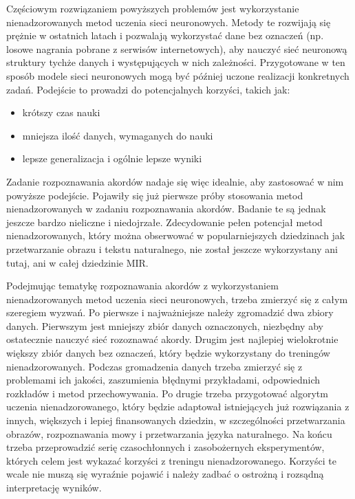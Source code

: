 Częściowym rozwiązaniem powyższych problemów jest wykorzystanie nienadzorowanych metod uczenia sieci neuronowych. Metody te rozwijają się prężnie w ostatnich latach i pozwalają wykorzystać dane bez oznaczeń (np. losowe nagrania pobrane z serwisów internetowych), aby nauczyć sieć neuronową struktury tychże danych i występujących w nich zależności. Przygotowane w ten sposób modele sieci neuronowych mogą być później uczone realizacji konkretnych zadań. Podejście to prowadzi do potencjalnych korzyści, takich jak:
\begin{itemize}
    \item krótszy czas nauki
    \item mniejsza ilość danych, wymaganych do nauki
    \item lepsze generalizacja i ogólnie lepsze wyniki
\end{itemize}
Zadanie rozpoznawania akordów nadaje się więc idealnie, aby zastosować w nim powyższe podejście. Pojawiły się już pierwsze próby stosowania metod nienadzorowanych w zadaniu rozpoznawania akordów. Badanie te są jednak jeszcze bardzo nieliczne i niedojrzałe. Zdecydowanie pełen potencjał metod nienadzorowanych, który można obserwować w popularniejszych dziedzinach jak przetwarzanie obrazu i tekstu naturalnego, nie został jeszcze wykorzystany ani tutaj, ani w całej dziedzinie MIR.

Podejmując tematykę rozpoznawania akordów z wykorzystaniem nienadzorowanych metod uczenia sieci neuronowych, trzeba zmierzyć się z całym szeregiem wyzwań. Po pierwsze i najważniejsze należy zgromadzić dwa zbiory danych. Pierwszym jest mniejszy zbiór danych oznaczonych, niezbędny aby ostatecznie nauczyć sieć rozoznawać akordy. Drugim jest najlepiej wielokrotnie większy zbiór danych bez oznaczeń, który będzie wykorzystany do treningów nienadzorowanych. Podczas gromadzenia danych trzeba zmierzyć się z problemami ich jakości, zaszumienia błędnymi przykładami, odpowiednich rozkładów i metod przechowywania. Po drugie trzeba przygotować algorytm uczenia nienadzorowanego, który będzie adaptował istniejących już rozwiązania z innych, większych i lepiej finansowanych dziedzin, w szczególności przetwarzania obrazów, rozpoznawania mowy i przetwarzania języka naturalnego. Na końcu trzeba przeprowadzić serię czasochłonnych i zasobożernych eksperymentów, których celem jest wykazać korzyści z treningu nienadzorowanego. Korzyści te wcale nie muszą się wyraźnie pojawić i należy zadbać o ostrożną i rozsądną interpretację wyników.

